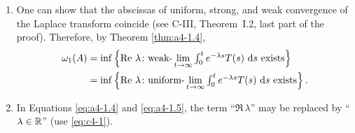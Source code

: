 \begin{remarks*}\label{rem:a4-1.4}

\begin{enumerate}[\upshape (i), wide, labelsep=1em]

\item 
One can show that the abscissas of uniform, strong, and weak convergence of the Laplace transform coincide (see C-III, Theorem~I.2, last part of the proof). 
Therefore, by Theorem \ref{thm:a4-1.4},
\begin{align}\label{eq:a4-1.5}
\omega_1(A) &= \inf \left\{ \mathop{}\!\mathrm{Re}\,\,\lambda\colon\text{weak-} \lim_{t \to \infty} \textstyle{\int_0^t e^{-\lambda s} T(s) \,\mathop{}\!\mathrm{d}{s}} \text{ exists} \right\}
\\
    &= \inf \left\{ \mathop{}\!\mathrm{Re}\,\,\lambda\colon\text{uniform-} \lim_{t \to \infty} \textstyle{\int_0^t e^{-\lambda s} T(s) \,\mathop{}\!\mathrm{d}{s}} \text{ exists} \right\}.\notag
\end{align}

\item
In Equations \eqref{eq:a4-1.4} and \eqref{eq:a4-1.5}, the term \enquote{$\Re\,\lambda$} may be replaced by \enquote{$\lambda \in \mathbb{R}$} (use \eqref{eq:c4-1}).
\end{enumerate}

\end{remarks*}
